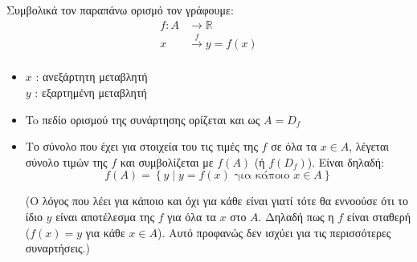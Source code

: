 \documentclass[a4paper,12pt]{article}
\begin{document}
Συμβολικά τον παραπάνω ορισμό τον γράφουμε:
\begin{align*}
f \colon A &\to \mathbb{R}\\
x &\xrightarrow{f} y = f(x)\\
\end{align*}

\begin{itemize}
    \item $x$ : ανεξάρτητη μεταβλητή\\
    $y$ : εξαρτημένη μεταβλητή

    \item To πεδίο ορισμού της συνάρτησης ορίζεται και ως $A = D_{f}$


    \item Το σύνολο που έχει για στοιχεία του τις τιμές της $f$ σε όλα τα $x\in A$, λέγεται σύνολο τιμών της $f$ και συμβολίζεται με $f(A)$ (ή $f(D_{f})$). Είναι δηλαδή:
    \[
        f(A) = \left\{ y \mid y = f(x) \text{ για κάποιο } x \in A \right\}
    \]

    (Ο λόγος που λέει για κάποιο και όχι για κάθε είναι γιατί τότε θα εννοούσε ότι το ίδιο $y$ είναι αποτέλεσμα της $f$ για όλα τα $x$ στο $A$. Δηλαδή πως η $f$ είναι σταθερή ($f(x) = y$ για κάθε $x \in A$). Αυτό προφανώς δεν ισχύει για τις περισσότερες συναρτήσεις.)
\end{itemize}
\end{document}
